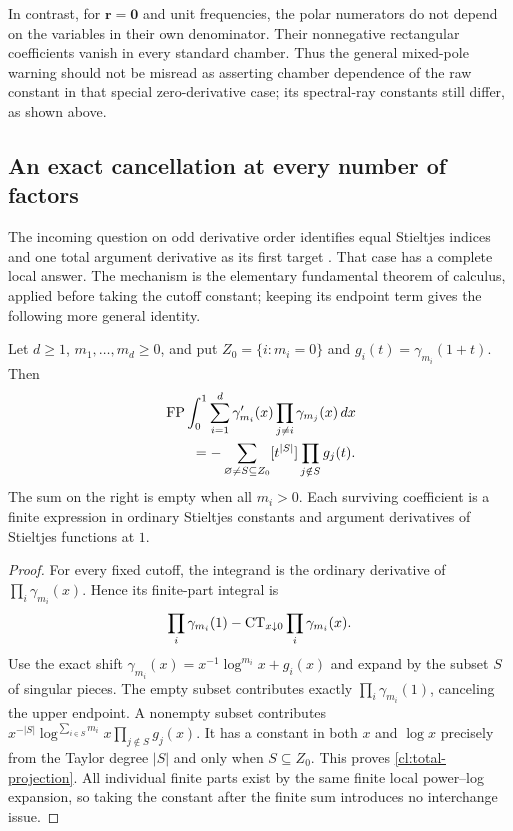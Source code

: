 In contrast, for $\boldsymbol r=\boldsymbol0$ and unit frequencies,
the polar numerators do not depend on the variables in their own
denominator. Their nonnegative rectangular coefficients vanish in
every standard chamber. Thus the general mixed-pole warning should
not be misread as asserting chamber dependence of the raw constant
in that special zero-derivative case; its spectral-ray constants still
differ, as shown above.

\subsection{An exact cancellation at every number of factors}

The incoming question on odd derivative order identifies equal Stieltjes
indices and one total argument derivative as its first target
\cite[Question~3]{RepoExact}. That case has a complete local answer.
The mechanism is the elementary fundamental theorem of calculus, applied
before taking the cutoff constant; keeping its endpoint term gives the
following more general identity.

\begin{theorem}
\label{cl:total-derivative}
Let $d\ge1$, $m_1,\ldots,m_d\ge0$, and put
$Z_0=\{i:m_i=0\}$ and $g_i(t)=\gamma_{m_i}(1+t)$. Then
\begin{align}
 &\operatorname{FP}\int_0^1\sum_{i=1}^d\gamma_{m_i}'(x)
                   \prod_{j\ne i}\gamma_{m_j}(x)\,dx\notag\\
 &\qquad=-\sum_{\varnothing\ne S\subseteq Z_0}
              [t^{|S|}]\prod_{j\notin S}g_j(t).
 \label{cl:total-projection}
\end{align}
The sum on the right is empty when all $m_i>0$. Each surviving
coefficient is a finite expression in ordinary Stieltjes constants and
argument derivatives of Stieltjes functions at $1$.
\end{theorem}
\begin{proof}
For every fixed cutoff, the integrand is the ordinary derivative of
$\prod_i\gamma_{m_i}(x)$. Hence its finite-part integral is
\[
 \prod_i\gamma_{m_i}(1)
       -\operatorname{CT}_{x\downarrow0}\prod_i\gamma_{m_i}(x).
\]
Use the exact shift
$\gamma_{m_i}(x)=x^{-1}\log^{m_i}x+g_i(x)$ and expand by the
subset $S$ of singular pieces. The empty subset contributes exactly
$\prod_i\gamma_{m_i}(1)$, canceling the upper endpoint.
A nonempty subset contributes
$x^{-|S|}\log^{\sum_{i\in S}m_i}x\prod_{j\notin S}g_j(x)$.
It has a constant in both $x$ and $\log x$ precisely from the
Taylor degree $|S|$ and only when $S\subseteq Z_0$.
This proves \eqref{cl:total-projection}. All individual finite parts
exist by the same finite local power--log expansion, so taking the
constant after the finite sum introduces no interchange issue.
\end{proof}

